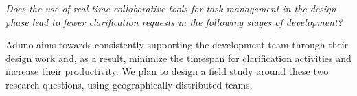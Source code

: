 \documentclass[conference]{IEEEtran}
\begin{document}
\textit{Does the use of real-time collaborative tools for task management in the design phase lead to fewer clarification requests in the following stages of development?}

Aduno aims towards consistently supporting the development team through their design work and, as a result, minimize the timespan for clarification activities and increase their productivity. We plan to design a field study around these two research questions, using geographically distributed teams. 


 

\end{document}
